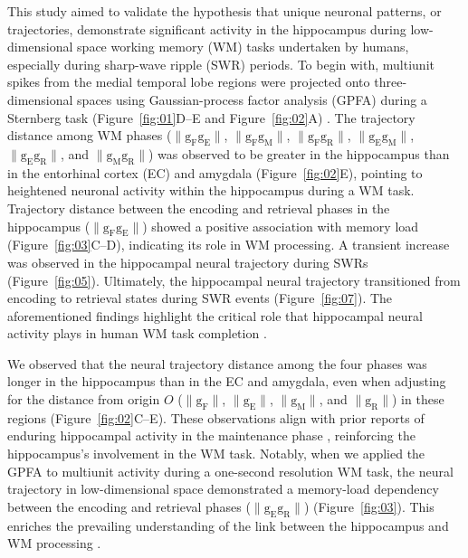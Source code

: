 \documentclass[final,3p,times,twocolumn]{elsarticle}
\begin{document}
This study aimed to validate the hypothesis that unique neuronal patterns, or trajectories, demonstrate significant activity in the hippocampus during low-dimensional space working memory (WM) tasks undertaken by humans, especially during sharp-wave ripple (SWR) periods. To begin with, multiunit spikes from the medial temporal lobe regions were projected onto three-dimensional spaces using Gaussian-process factor analysis (GPFA) during a Sternberg task (Figure~\ref{fig:01}D--E and Figure~\ref{fig:02}A) \cite{yu_gaussian-process_2009}. The trajectory distance among WM phases ($\mathrm{\lVert g_{F}g_{E} \rVert}$, $\mathrm{\lVert g_{F}g_{M} \rVert}$, $\mathrm{\lVert g_{F}g_{R} \rVert}$, $\mathrm{\lVert g_{E}g_{M} \rVert}$, $\mathrm{\lVert g_{E}g_{R} \rVert}$, and $\mathrm{\lVert g_{M}g_{R} \rVert}$) was observed to be greater in the hippocampus than in the entorhinal cortex (EC) and amygdala (Figure~\ref{fig:02}E), pointing to heightened neuronal activity within the hippocampus during a WM task. Trajectory distance between the encoding and retrieval phases in the hippocampus ($\mathrm{\lVert g_{F}g_{E} \rVert}$) showed a positive association with memory load (Figure~\ref{fig:03}C--D), indicating its role in WM processing. A transient increase was observed in the hippocampal neural trajectory during SWRs (Figure~\ref{fig:05}). Ultimately, the hippocampal neural trajectory transitioned from encoding to retrieval states during SWR events (Figure~\ref{fig:07}). The aforementioned findings highlight the critical role that hippocampal neural activity plays in human WM task completion \cite{naber_reciprocal_2001,van_strien_anatomy_2009,strange_functional_2014}.

We observed that the neural trajectory distance among the four phases was longer in the hippocampus than in the EC and amygdala, even when adjusting for the distance from origin $O$ ($\mathrm{\lVert g_{F} \rVert}$, $\mathrm{\lVert g_{E} \rVert}$, $\mathrm{\lVert g_{M} \rVert}$, and $\mathrm{\lVert g_{R} \rVert}$) in these regions (Figure~\ref{fig:02}C--E). These observations align with prior reports of enduring hippocampal activity in the maintenance phase \cite{boran_persistent_2019,kaminski_persistently_2017,kornblith_persistent_2017,faraut_dataset_2018}, reinforcing the hippocampus's involvement in the WM task. Notably, when we applied the GPFA to multiunit activity during a one-second resolution WM task, the neural trajectory in low-dimensional space demonstrated a memory-load dependency between the encoding and retrieval phases ($\mathrm{\lVert g_{E}g_{R} \rVert}$) (Figure~\ref{fig:03}). This enriches the prevailing understanding of the link between the hippocampus and WM processing \cite{oso_boran_2020}.
\end{document}
